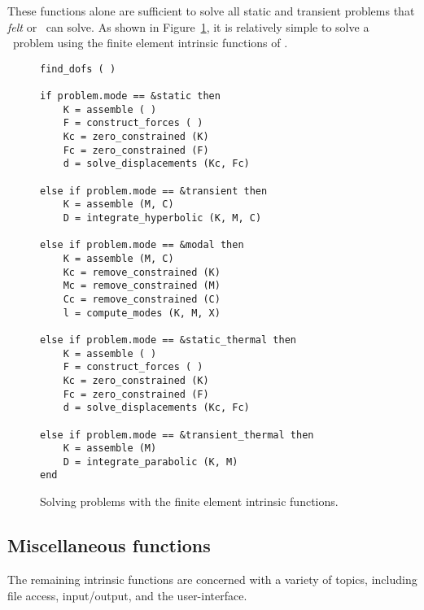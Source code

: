 These functions alone are sufficient to solve all static and transient
problems that {\em felt} or \velvet\ can solve.  As shown in
Figure~\ref{burlap.solving}, it is relatively simple to solve a \felt\
problem using the finite element intrinsic functions of \burlap.

\begin{figure}[htbp]
\begin{center}
\begin{verbatim}
find_dofs ( )

if problem.mode == &static then
    K = assemble ( )
    F = construct_forces ( )
    Kc = zero_constrained (K)
    Fc = zero_constrained (F)
    d = solve_displacements (Kc, Fc)

else if problem.mode == &transient then
    K = assemble (M, C)
    D = integrate_hyperbolic (K, M, C)

else if problem.mode == &modal then
    K = assemble (M, C)
    Kc = remove_constrained (K)
    Mc = remove_constrained (M)
    Cc = remove_constrained (C)
    l = compute_modes (K, M, X)

else if problem.mode == &static_thermal then
    K = assemble ( )
    F = construct_forces ( )
    Kc = zero_constrained (K)
    Fc = zero_constrained (F)
    d = solve_displacements (Kc, Fc)

else if problem.mode == &transient_thermal then
    K = assemble (M)
    D = integrate_parabolic (K, M)
end
\end{verbatim}
\caption{Solving problems with the finite element intrinsic functions.}
\label{burlap.solving}
\end{center}
\end{figure}


\subsection{Miscellaneous functions}
\label{burlap.misc.functions}

The remaining intrinsic functions are concerned with a variety of
topics, including file access, input/output, and the user-interface.

